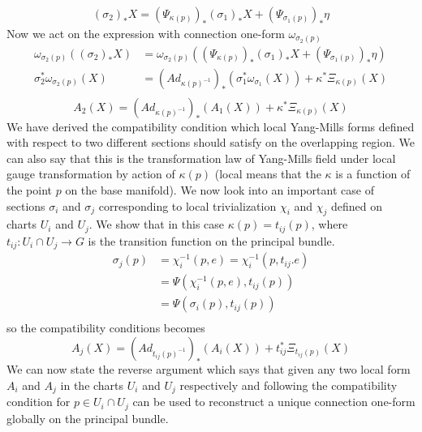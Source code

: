 \documentclass[12pt]{article}
\begin{document}
\begin{align*}
    (\sigma_2)_{\ast}X = (\Psi_{\kappa(p)})_{\ast}(\sigma_{1})_{\ast}X + (\Psi_{\sigma_{1}(p)})_{\ast}\eta
\end{align*} Now we act on the expression with connection one-form $\omega_{\sigma_{2}(p)}$ \\
\begin{align*}
    \omega_{\sigma_{2}(p)}((\sigma_2)_{\ast}X) &= \omega_{\sigma_{2}(p)}((\Psi_{\kappa(p)})_{\ast}(\sigma_{1})_{\ast}X + (\Psi_{\sigma_{1}(p)})_{\ast}\eta) \\
  \sigma_2^{\ast}\omega_{\sigma_{2}(p)}(X) &= (Ad_{\kappa(p)^{-1}})_{\ast}(\sigma_{1}^{\ast}\omega_{\sigma_{1}}(X)) + \kappa^{\ast}\Xi_{\kappa(p)}(X) \\
\end{align*} 
\begin{equation}\label{compatiblity}
    A_{2}(X) = (Ad_{\kappa(p)^{-1}})_{\ast}(A_{1}(X)) + \kappa^{\ast}\Xi_{\kappa(p)}(X)
\end{equation}
We have derived the compatibility condition which local Yang-Mills forms defined with respect to two different sections should satisfy on the overlapping region. We can also say that this is the transformation law of Yang-Mills field under local gauge transformation by action of $\kappa(p)$ (local means that the $\kappa$ is a function of the point $p$ on the base manifold). We now look into an important case of sections $\sigma_{i}$ and $\sigma_{j}$ corresponding to local trivialization $\chi_{i}$ and $\chi_{j}$ defined on charts $U_{i}$ and $U_{j}$. We show that in this case $\kappa(p) = t_{ij}(p)$, where $t_{ij} \colon U_{i} \cap U_{j} \to G$ is the transition function on the principal bundle.
\begin{align*}
    \sigma_{j}(p) &= \chi_{i}^{-1}(p, e) = \chi_{i}^{-1}(p, t_{ij}.e) \\
                  &= \Psi(\chi_{i}^{-1}(p, e), t_{ij}(p)) \\
                  &= \Psi(\sigma_{i}(p), t_{ij}(p)) \\
\end{align*}so the compatibility conditions becomes
\begin{equation}
    A_{j}(X) = (Ad_{t_{ij}(p)^{-1}})_{\ast}(A_{i}(X)) + t_{ij}^{\ast}\Xi_{t_{ij}(p)}(X)
\end{equation}
We can now state the reverse argument which says that given any two local form $A_{i}$ and $A_{j}$ in the charts $U_{i}$ and $U_{j}$ respectively and following the compatibility condition for $p \in U_{i} \cap U_{j}$ can be used to reconstruct a unique connection one-form globally on the principal bundle.
\end{document}
